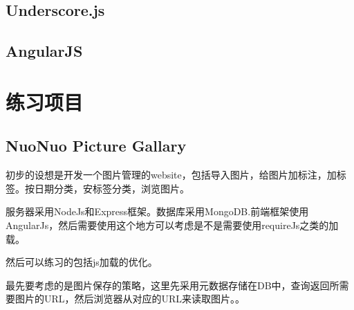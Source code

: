 \documentclass[12pt, oneside, b5paper]{book}
\begin{document}
\begin{CJK}{UTF8}{gkai}
	\subsection{Underscore.js}

  \subsection{AngularJS}

  

  \section{练习项目}

  \subsection{NuoNuo Picture Gallary}

  初步的设想是开发一个图片管理的website，包括导入图片，给图片加标注，加标签。按日期分类，安标签分类，浏览图片。

  服务器采用NodeJs和Express框架。数据库采用MongoDB.前端框架使用AngularJs，然后需要使用这个地方可以考虑是不是需要使用requireJs之类的加载。

  然后可以练习的包括js加载的优化。

  最先要考虑的是图片保存的策略，这里先采用元数据存储在DB中，查询返回所需要图片的URL，然后浏览器从对应的URL来读取图片。。

  
		
\newpage
\end{CJK}  
\end{document}
